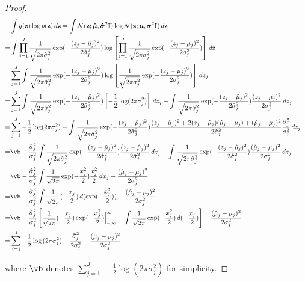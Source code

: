 \documentclass{article} %
\theoremstyle{plain}
\theoremstyle{definition}
\theoremstyle{remark}
\numberwithin{equation}{section}
\begin{document}
\begin{proof}
\begin{align}
&\int q({\bf z})\log p({\bf z})\,d{\bf z}
=\int \mathcal{N}({\bf z};\boldsymbol{\hat\mu},\boldsymbol{\hat\sigma}^2{\bf I})\log{\mathcal{N}({\bf z};\boldsymbol \mu,\boldsymbol{\sigma}^2{\bf I})}\,d{\bf z}&\nonumber\\
=&\int\prod_{j=1}^J\frac{1}{\sqrt{2\pi\hat\sigma_j^2}}\exp(-\frac{(z_j-\hat\mu_j)^2}{2\hat\sigma_j^2})\log\left[{\prod_{j=1}^J\frac{1}{\sqrt{2\pi\sigma_j^2}}\exp(-\frac{(z_j-\mu_j)^2}{2\sigma_j^2}})\right]\,d{\bf z}\nonumber\\
=&\sum_{j=1}^J\int \frac{1}{\sqrt{2\pi\hat\sigma_j^2}}\exp(-\frac{(z_j-\hat\mu_j)^2}{2\hat\sigma_j^2})\log\left[{\frac{1}{\sqrt{2\pi\sigma_j^2}}\exp(-\frac{(z_j-\mu_j)^2}{2\sigma_j^2}})\right]\,d{z_j}\nonumber\\
=&\sum_{j=1}^J\int \frac{1}{\sqrt{2\pi\hat\sigma_j^2}}\exp(-\frac{(z_j-\hat\mu_j)^2}{2\hat\sigma_j^2})\left[-\frac{1}{2}\log (2\pi\sigma_j^2)\right]\,d{z_j}-\int\frac{1}{\sqrt{2\pi\hat\sigma_j^2}}\exp(-\frac{(z_j-\hat\mu_j)^2}{2\hat\sigma_j^2})\frac{(z_j-\mu_j)^2}{2\sigma_j^2}\,d{z_j}\nonumber\\
=&\sum_{j=1}^J -\frac{1}{2}\log (2\pi\sigma_j^2)-\int\frac{1}{\sqrt{2\pi\hat\sigma_j^2}}\exp(-\frac{(z_j-\hat\mu_j)^2}{2\hat\sigma_j^2})\frac{(z_j-\hat\mu_j)^2+2(z_j-\hat\mu_j)(\hat\mu_j-\mu_j)+(\hat\mu_j-\mu_j)^2}{2\hat\sigma_j^2}\frac{\hat\sigma_j^2}{\sigma_j^2}\,d{z_j}\nonumber\\
=&\vb -\frac{\hat\sigma_j^2}{\sigma_j^2}\int\frac{1}{\sqrt{2\pi\hat\sigma_j^2}}\exp(-\frac{(z_j-\hat\mu_j)^2}{2\hat\sigma_j^2})\frac{(z_j-\hat\mu_j)^2}{2\hat\sigma_j^2}\,d{z_j}\nonumber
-\int\frac{1}{\sqrt{2\pi\hat\sigma_j^2}}\exp(-\frac{(z_j-\hat\mu_j)^2}{2\hat\sigma_j^2})\frac{(\hat\mu_j-\mu_j)^2}{2\sigma_j^2}\,d{z_j}&\nonumber\\
=&\vb-\frac{\hat\sigma_j^2}{\sigma_j^2}\int\frac{1}{\sqrt{2\pi}}\exp(-\frac{x_j^2}{2})\frac{x_j^2}{2}\,d{x_j}-\frac{(\hat\mu_j-\mu_j)^2}{2\sigma_j^2}\nonumber\\
=&\vb-\frac{\hat\sigma_j^2}{\sigma_j^2}\int\frac{1}{\sqrt{2\pi}}(-\frac{x_j}{2})\,d{(\exp(-\frac{x_j^2}{2}))}-\frac{(\hat\mu_j-\mu_j)^2}{2\sigma_j^2}\nonumber\\
=&\vb-\frac{\hat\sigma_j^2}{\sigma_j^2}\left[\frac{1}{\sqrt{2\pi}}(-\frac{x_j}{2})\exp(-\frac{x_j^2}{2})\Big|_{-\infty}^{\infty}-\int\frac{1}{\sqrt{2\pi}}\exp(-\frac{x_j^2}{2})\,d{(-\frac{x_j}{2})}\right]-\frac{(\hat\mu_j-\mu_j)^2}{2\sigma_j^2}\nonumber\\
=&\sum_{j=1}^J-\frac{1}{2}\log{(2\pi \sigma_j^2)}-\frac{\hat\sigma_j^2}{2\sigma_j^2}-\frac{(\hat\mu_j-\mu_j)^2}{2\sigma_j^2}\nonumber
\end{align}

where $\vb$ denotes $\sum_{j=1}^J -\frac{1}{2}\log (2\pi\sigma_j^2)$ for simplicity.
    
\end{proof}
\end{document}
